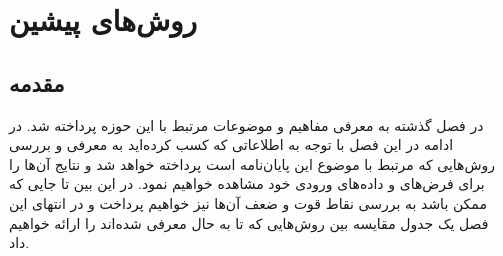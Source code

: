 
\chapter{روش‌های پیشین}

\section{مقدمه}
در فصل گذشته به معرفی مفاهیم و موضوعات مرتبط با این حوزه پرداخته شد. در ادامه در این فصل با توجه به اطلاعاتی که کسب کرده‌اید به معرفی و بررسی روش‌هایی که مرتبط با موضوع این پایان‌نامه است پرداخته خواهد شد و نتایج آن‌ها را برای فرض‌های و داده‌های ورودی خود مشاهده خواهیم نمود. در این بین تا جایی که ممکن باشد به بررسی نقاط قوت و ضعف آن‌ها نیز خواهیم پرداخت و در انتهای این فصل یک جدول مقایسه بین روش‌هایی که تا به حال معرفی شده‌اند را ارائه خواهیم داد.



